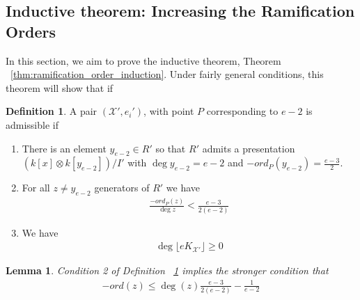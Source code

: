 \documentclass{amsart}
\theoremstyle{plain}
\newtheorem{lem}[thm]{Lemma}
\theoremstyle{definition}
\newtheorem{defn}[thm]{Definition}
\theoremstyle{remark}
\numberwithin{equation}{section}
\newcommand\ssec{\subsection}
\newcommand \sx{\mathscr X}
\begin{document}
\ssec{Inductive theorem: Increasing the Ramification Orders}
\label{ssec:g_0_ram_orders}
In this section, we aim to prove the inductive theorem, Theorem ~\ref{thm:ramification_order_induction}. Under fairly general conditions, this theorem will show that if 

\begin{defn}
\label{defn:admissible}
A pair $(\sx',e_i')$, with point $P$ corresponding to $e-2$ is admissible if
\begin{enumerate}
	\item There is an element $y_{e-2} \in R'$ so that $R'$ admits a presentation $(k[x] \otimes k[y_{e-2}])/I'$ with $\deg y_{e-2} = e-2$ and $-ord_P(y_{e-2}) = \frac{e-3}{2}$.
\item For all $z \neq y_{e-2}$ generators of $R'$ we have
\begin{align*}
	\frac{- ord_P(z)}{\deg z} < \frac{e-3}{2(e-2)}
\end{align*}
\item We have
\begin{align*}
	\deg \lfloor e K_{\sx'} \rfloor \geq 0
\end{align*}
\end{enumerate}
\end{defn}

\begin{lem}
\label{lem:admissible_inequality}
Condition 2 of Definition ~\ref{defn:admissible} implies the stronger condition that
\begin{align*}
	-ord(z) \leq \deg(z) \frac{e-3}{2(e-2)}-\frac{1}{e-2}
\end{align*}
\end{lem}
\end{document}

